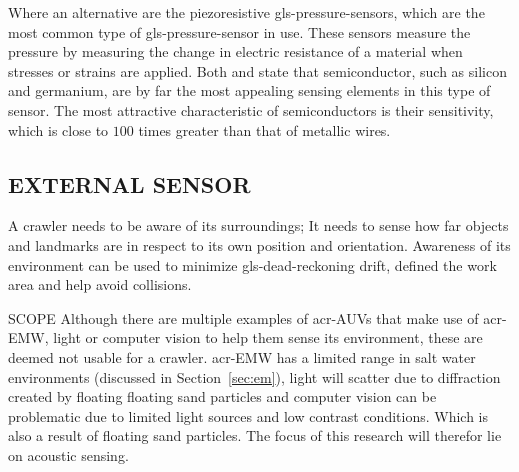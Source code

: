Where an alternative are the piezoresistive \gls{gls-pressure-sensor}s, which are the most common type of
\gls{gls-pressure-sensor} in use. These sensors measure the pressure by measuring the change in electric resistance of a
material when stresses or strains are applied. Both \citet{webster_measurement_1999} and \citet{liptak_instrument_2003}
state that semiconductor, such as silicon and germanium, are by far the most appealing sensing elements in this type of
sensor. The most attractive characteristic of semiconductors is their sensitivity, which is close to \( 100 \) times
greater than that of metallic wires.

\subsection{EXTERNAL SENSOR}\label{sec:sensorenvironment}

A crawler needs to be aware of its surroundings; It needs to sense how far objects and landmarks are in respect to its
own position and orientation. Awareness of its environment can be used to minimize \gls{gls-dead-reckoning} drift,
defined the work area and help avoid collisions.

\begin{RoyalNote}{SCOPE}
    Although there are multiple examples of \gls{acr-AUV}s that make use of \gls{acr-EMW}, light or computer vision to
    help them sense its environment, these are deemed not usable for a crawler. \gls{acr-EMW} has a limited range in
    salt water environments (discussed in Section~\ref{sec:em}), light will scatter due to diffraction created by floating
    floating sand particles and computer vision can be problematic due to limited light sources and low contrast
    conditions. Which is also a result of floating sand particles. The focus of this research will therefor lie on
    acoustic sensing.
\end{RoyalNote}
\clearpage